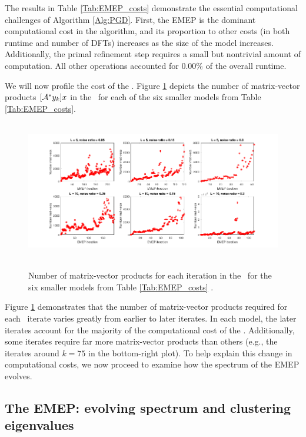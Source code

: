 The results in Table \ref{Tab:EMEP_costs} demonstrate the essential computational challenges of Algorithm \ref{Alg:PGD}.  First, the EMEP is the dominant computational cost in the algorithm, and its proportion to other costs (in both runtime and number of DFTs) increases as the size of the model increases.  Additionally, the primal refinement step requires a small but nontrivial amount of computation.  All other operations accounted for $0.00\%$ of the overall runtime. 



We will now profile the cost of the \emep.
Figure \ref{Fig:EMEP_costs_num_mat_vecs} depicts the number of matrix-vector products $[{\mathcal A}^*y_k]x$ in the \emep \ for each of the six smaller models from Table \ref{Tab:EMEP_costs}. 

\begin{figure}[H]
\centering
\hbox{\hspace{-1.9cm} \includegraphics[scale=0.6]{EMEP_costs_num_mat_vecs} }\vspace{-0.4cm}
	\caption{Number of matrix-vector products for each iteration in the \emep \ for the six smaller models from Table \ref{Tab:EMEP_costs}	.}
\label{Fig:EMEP_costs_num_mat_vecs}
\end{figure}

Figure \ref{Fig:EMEP_costs_num_mat_vecs} demonstrates that the number of matrix-vector products required for each \emep \ iterate varies greatly from earlier to later iterates.  
In each model, the later iterates account for the majority of the computational cost of the \emep.  
Additionally, some iterates require far more matrix-vector products than others (e.g., the iterates around $k=75$ in the bottom-right plot).
To help explain this change in computational costs, we now proceed to examine how the spectrum of the EMEP evolves.



\subsection{The EMEP: evolving spectrum and clustering eigenvalues} 	\label{Subsubsec:evol_mats-EMEP_spectrum_and_clustering}


